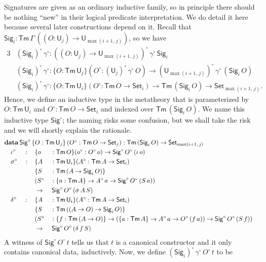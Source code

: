 \documentclass[acmsmall,screen,review,anonymous]{acmart}
\newcommand{\msf}[1]{{\mathsf{#1}}}
\newcommand{\mbf}[1]{{\mathbf{#1}}}
\newcommand{\data}{\mbf{data}}
\newcommand{\U}{\msf{U}}
\newcommand{\Set}{\msf{Set}}
\newcommand{\Sig}{\msf{Sig}}
\newcommand{\Tm}{\msf{Tm}}
\newcommand{\w}{\circ}
\begin{document}
Signatures are given as an ordinary inductive family, so in principle there should be nothing
``new'' in their logical predicate interpretation. We do detail it here because several later
constructions depend on it. Recall that $\Sig_i : \Tm\,\Gamma\,((O : \U_j) \to \U_{\max(i+1,\,j)})$,
so we have
\begin{alignat*}{3}
  &(\Sig_i)^\w\,\gamma^\w : ((O : \U_j) \to \U_{\max(i+1,\,j)})^\w\,\gamma^\w\,\Sig_i\\
  &(\Sig_i)^\w\,\gamma^\w : \{O : \Tm\,\U_j\}(O^\w : (\U_j)^\w\,\gamma^\w\,O) \to (\U_{\max(i+1,\,j)})^\w\,\gamma^\w\,(\Sig_i\,O)\\
  &(\Sig_i)^\w\,\gamma^\w : \{O : \Tm\,\U_i\}(O^\w : \Tm\,O \to \Set_i) \to \Tm\,(\Sig_i\,O) \to \Set_{\max(i+1,\,j)}.
\end{alignat*}
Hence, we define an inductive type in the metatheory that is parameterized by $O : \Tm\,\U_i$ and
$O^\w : \Tm\,O \to \Set_i$ and indexed over $\Tm\,(\Sig_i\,O)$. We name this inductive type
$\Sig^\w$; the naming risks some confusion, but we shall take the risk and we will shortly
explain the rationale.
\begin{alignat*}{4}
  &\rlap{$\data\,\Sig^\w\,\{O : \Tm\,\U_j\}\,(O^\w : \Tm\,O \to \Set_j)  : \Tm\,(\Sig_i\,O) \to \Set_{\max(i+1,\,j)}$}\\
  &\quad \iota^\w  &&:\,&&\{o &&: \Tm\,O\}(o^\w : O^\w\,o) \to \Sig^\w\,O^\w\,(\iota\,o)\\
  &\quad \sigma^\w &&:\,&&\{A &&: \Tm\,\U_i\}(A^\w : \Tm\,A \to \Set_i)\\
  &               && &&\{S &&: \Tm\,(A \to \Sig_i\,O)\}\\
  &               && && (S^\w &&: \{a : \Tm\,A\} \to A^\w\,a \to \Sig^\w\,O^\w\,(S\,a))\\
  &               && && \to &&\,\Sig^\w\,O^\w\,(\sigma\,A\,S)\\
  &\quad \delta^\w &&:\,&&\{A &&: \Tm\,\U_i\}(A^\w : \Tm\,A \to \Set_i)\\
  &               &&   && \{S &&: \Tm\,((A \to O) \to \Sig_i\,O)\}\\
  &               &&   && (S^\w &&: \{f : \Tm\,(A \to O)\} \to (\{a : \Tm\,A\} \to A^\w\,a \to O^\w\,(f\,a)) \to \Sig^\w\,O^\w\,(S\,f))\\
  &\quad          &&   && \to &&\,\Sig^\w\,O^\w\,(\delta\,f\,S)
\end{alignat*}
A witness of $\Sig^\w\,O^\w\,t$ tells us that $t$ is a canonical constructor and it only contains
canonical data, inductively. Now, we define $(\Sig_i)^\w\,\gamma^\w\,O^\w\,t$ to be
\end{document}
